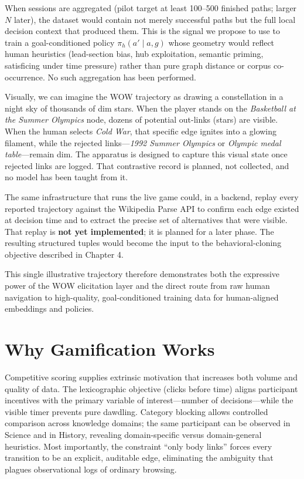 \documentclass[11pt,a4paper]{report}
\begin{document}
When sessions are aggregated (pilot target at least 100--500 finished paths; larger \(N\) later), the dataset would contain not merely successful paths but the full local decision context that produced them. This is the signal we propose to use to train a goal-conditioned policy \(\pi_h(a' \mid a, g)\) whose geometry would reflect human heuristics (lead-section bias, hub exploitation, semantic priming, satisficing under time pressure) rather than pure graph distance or corpus co-occurrence. No such aggregation has been performed.

Visually, we can imagine the WOW trajectory as drawing a constellation in a night sky of thousands of dim stars. When the player stands on the \textit{Basketball at the Summer Olympics} node, dozens of potential out-links (stars) are visible. When the human selects \textit{Cold War}, that specific edge ignites into a glowing filament, while the rejected links—\textit{1992 Summer Olympics} or \textit{Olympic medal table}—remain dim. The apparatus is designed to capture this visual state once rejected links are logged. That contrastive record is planned, not collected, and no model has been taught from it.

The same infrastructure that runs the live game could, in a backend, replay every reported trajectory against the Wikipedia Parse API to confirm each edge existed at decision time and to extract the precise set of alternatives that were visible. That replay is \textbf{not yet implemented}; it is planned for a later phase. The resulting structured tuples would become the input to the behavioral-cloning objective described in Chapter 4.

This single illustrative trajectory therefore demonstrates both the expressive power of the WOW elicitation layer and the direct route from raw human navigation to high-quality, goal-conditioned training data for human-aligned embeddings and policies.

\section{Why Gamification Works}

Competitive scoring supplies extrinsic motivation that increases both volume and quality of data. The lexicographic objective (clicks before time) aligns participant incentives with the primary variable of interest—number of decisions—while the visible timer prevents pure dawdling. Category blocking allows controlled comparison across knowledge domains; the same participant can be observed in Science and in History, revealing domain-specific versus domain-general heuristics. Most importantly, the constraint “only body links” forces every transition to be an explicit, auditable edge, eliminating the ambiguity that plagues observational logs of ordinary browsing.
\end{document}
